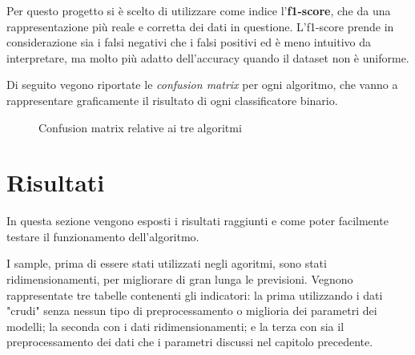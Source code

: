 \documentclass[12pt,a4paper]{article}
\begin{document}
Per questo progetto si è scelto di utilizzare come indice l'\textbf{f1-score}, che da una rappresentazione più reale e corretta dei dati in questione. L'f1-score prende in considerazione sia i falsi negativi che i falsi positivi ed è meno intuitivo da interpretare, ma molto più adatto dell'accuracy quando il dataset non è uniforme.

Di seguito vegono riportate le \textit{confusion matrix} per ogni algoritmo, che vanno a rappresentare graficamente il risultato di ogni classificatore binario.

\begin{figure}[H]
    \centering
    \caption{Confusion matrix relative ai tre algoritmi}
\end{figure}


\clearpage
\section{Risultati}
In questa sezione vengono esposti i risultati raggiunti e come poter facilmente testare il funzionamento dell'algoritmo.



I sample, prima di essere stati utilizzati negli agoritmi, sono stati ridimensionamenti, per migliorare di gran lunga le previsioni. Vegnono rappresentate tre tabelle contenenti gli indicatori: la prima utilizzando i dati "crudi" senza nessun tipo di preprocessamento o miglioria dei parametri dei modelli; la seconda con i dati ridimensionamenti; e la terza con sia il preprocessamento dei dati che i parametri discussi nel capitolo precedente.
\end{document}
